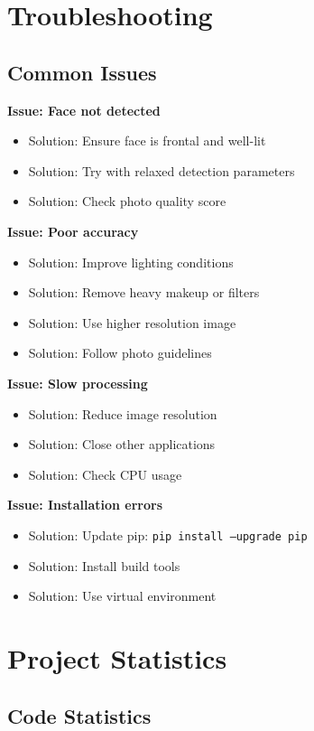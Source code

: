 \section{Troubleshooting}

\subsection{Common Issues}

\textbf{Issue: Face not detected}
\begin{itemize}
    \item Solution: Ensure face is frontal and well-lit
    \item Solution: Try with relaxed detection parameters
    \item Solution: Check photo quality score
\end{itemize}

\textbf{Issue: Poor accuracy}
\begin{itemize}
    \item Solution: Improve lighting conditions
    \item Solution: Remove heavy makeup or filters
    \item Solution: Use higher resolution image
    \item Solution: Follow photo guidelines
\end{itemize}

\textbf{Issue: Slow processing}
\begin{itemize}
    \item Solution: Reduce image resolution
    \item Solution: Close other applications
    \item Solution: Check CPU usage
\end{itemize}

\textbf{Issue: Installation errors}
\begin{itemize}
    \item Solution: Update pip: \texttt{pip install --upgrade pip}
    \item Solution: Install build tools
    \item Solution: Use virtual environment
\end{itemize}

\section{Project Statistics}

\subsection{Code Statistics}

